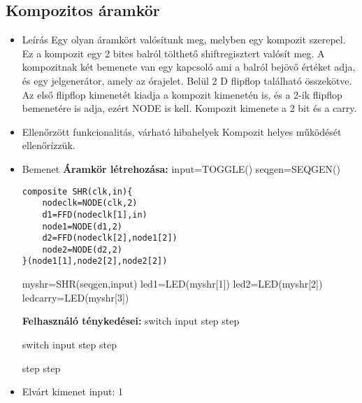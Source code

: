 \subsection{Kompozitos áramkör}
\begin{itemize}
\item Leírás\newline
Egy olyan áramkört valósítunk meg, melyben egy kompozit szerepel. Ez a kompozit egy 2 bites balról tölthető shiftregisztert valósít meg. A kompozitnak két bemenete van egy kapcsoló ami a balról bejövő értéket adja, és egy jelgenerátor, amely az órajelet. Belül 2 D flipflop található összekötve. Az első flipflop kimenetét kiadja a kompozit kimenetén is, és a 2-ik flipflop bemenetére is adja, ezért NODE is kell. Kompozit kimenete a 2 bit és a carry.
\item Ellenőrzött funkcionalitás, várható hibahelyek\newline
Kompozit helyes működését ellenőrízzük.
\item Bemenet\newline
\newline
{\bf Áramkör létrehozása:}\newline
input=TOGGLE() \newline
seqgen=SEQGEN()
\begin{verbatim}
composite SHR(clk,in){		
    nodeclk=NODE(clk,2)		
    d1=FFD(nodeclk[1],in)		
    node1=NODE(d1,2)			
    d2=FFD(nodeclk[2],node1[2])
    node2=NODE(d2,2)			
}(node1[1],node2[2],node2[2])	
\end{verbatim}
myshr=SHR(seqgen,input)\newline
led1=LED(myshr[1])\newline
led2=LED(myshr[2])\newline
ledcarry=LED(myshr[3])\newline

{\bf Felhasználó ténykedései:}\newline
switch input\newline
step\newline
step\newline

switch input\newline
step\newline
step\newline

step\newline
step\newline

\item Elvárt kimenet\newline
input: 1\newline


\end{itemize}
